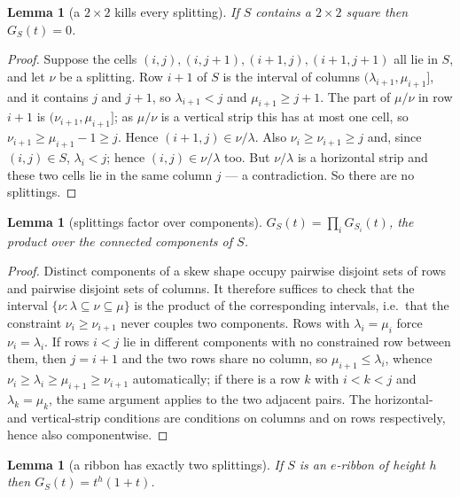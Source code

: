 \documentclass[11pt]{article}
\newtheorem{lemma}[theorem]{Lemma}
\theoremstyle{definition}
\begin{document}
\begin{lemma}[a $2\times2$ kills every splitting]\label{lem:2x2}
If $S$ contains a $2\times2$ square then $G_S(t)=0$.
\end{lemma}

\begin{proof}
Suppose the cells $(i,j),(i,j+1),(i+1,j),(i+1,j+1)$ all lie in $S$, and let $\nu$ be a
splitting. Row $i+1$ of $S$ is the interval of columns $(\lambda_{i+1},\mu_{i+1}]$, and it
contains $j$ and $j+1$, so $\lambda_{i+1}<j$ and $\mu_{i+1}\ge j+1$. The part of $\mu/\nu$ in
row $i+1$ is $(\nu_{i+1},\mu_{i+1}]$; as $\mu/\nu$ is a vertical strip this has at most one
cell, so $\nu_{i+1}\ge\mu_{i+1}-1\ge j$. Hence $(i+1,j)\in\nu/\lambda$. Also
$\nu_i\ge\nu_{i+1}\ge j$ and, since $(i,j)\in S$, $\lambda_i<j$; hence
$(i,j)\in\nu/\lambda$ too. But $\nu/\lambda$ is a horizontal strip and these two cells lie in
the same column $j$ --- a contradiction. So there are no splittings.
\end{proof}

\begin{lemma}[splittings factor over components]\label{lem:comp}
$G_S(t)=\prod_{i} G_{S_i}(t)$, the product over the connected components of $S$.
\end{lemma}

\begin{proof}
Distinct components of a skew shape occupy pairwise disjoint sets of rows and pairwise disjoint
sets of columns. It therefore suffices to check that the interval
$\{\nu:\lambda\subseteq\nu\subseteq\mu\}$ is the product of the corresponding intervals, i.e.\
that the constraint $\nu_i\ge\nu_{i+1}$ never couples two components. Rows with
$\lambda_i=\mu_i$ force $\nu_i=\lambda_i$. If rows $i<j$ lie in different components with no
constrained row between them, then $j=i+1$ and the two rows share no column, so
$\mu_{i+1}\le\lambda_i$, whence $\nu_i\ge\lambda_i\ge\mu_{i+1}\ge\nu_{i+1}$ automatically; if
there is a row $k$ with $i<k<j$ and $\lambda_k=\mu_k$, the same argument applies to the two
adjacent pairs. The horizontal- and vertical-strip conditions are conditions on columns and on
rows respectively, hence also componentwise.
\end{proof}

\begin{lemma}[a ribbon has exactly two splittings]\label{lem:ribbon}
If $S$ is an $e$-ribbon of height $h$ then $G_S(t)=t^{h}(1+t)$.
\end{lemma}
\end{document}
